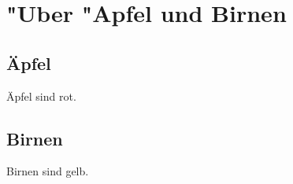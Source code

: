 \documentclass{article}
\begin{document}
	\tableofcontents
	
	\section{"Uber "Apfel und Birnen}
	
	\subsection{Äpfel}
	Äpfel sind rot.
	
	\subsection{Birnen}
	Birnen sind gelb.
	
\end{document}
